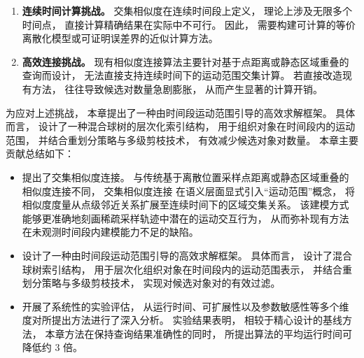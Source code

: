     \begin{enumerate}
        \item \textbf{连续时间计算挑战。} 交集相似度在连续时间段上定义， 理论上涉及无限多个时间点， 直接计算精确结果在实际中不可行。 因此， 需要构建可计算的等价离散化模型或可证明误差界的近似计算方法。

        \item \textbf{高效连接挑战。} 现有相似度连接算法主要针对基于点距离或静态区域重叠的查询而设计， 无法直接支持连续时间下的运动范围交集计算。 若直接改造现有方法， 往往导致候选对数量急剧膨胀， 从而产生显著的计算开销。
    \end{enumerate}

为应对上述挑战， 本章提出了一种由时间段运动范围引导的高效求解框架。 具体而言， 设计了一种混合球树的层次化索引结构， 用于组织对象在时间段内的运动范围， 并结合重划分策略与多级剪枝技术， 有效减少候选对象对数量。 本章主要贡献总结如下：

\begin{itemize}
\item
提出了交集相似度连接。 与传统基于离散位置采样点距离或静态区域重叠的相似度连接不同， 交集相似度连接 在语义层面显式引入“运动范围”概念， 将相似度度量从点级邻近关系扩展至连续时间下的区域交集关系。 该建模方式能够更准确地刻画稀疏采样轨迹中潜在的运动交互行为， 从而弥补现有方法在未观测时间段内建模能力不足的缺陷。

\item
设计了一种由时间段运动范围引导的高效求解框架。 具体而言， 设计了混合球树索引结构， 用于层次化组织对象在时间段内的运动范围表示， 并结合重划分策略与多级剪枝技术， 实现对候选对象对的有效过滤。

\item
开展了系统性的实验评估， 从运行时间、可扩展性以及参数敏感性等多个维度对所提出方法进行了深入分析。 实验结果表明， 相较于精心设计的基线方法， 本章方法在保持查询结果准确性的同时， 所提出算法的平均运行时间可降低约 3 倍。

\end{itemize}



